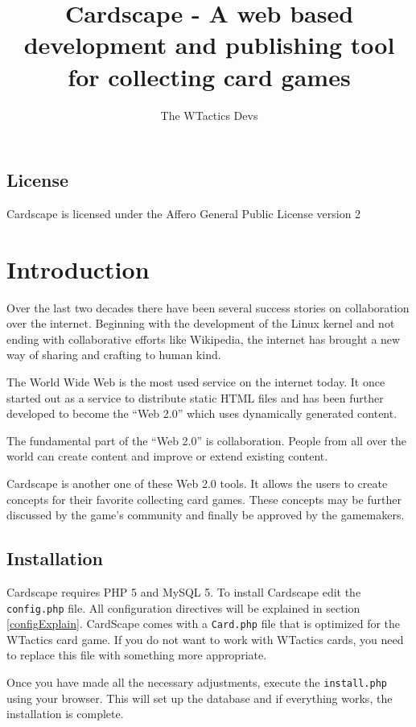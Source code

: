 \documentclass[a4paper, 11pt]{scrbook}
\title{Cardscape - A web based development and publishing tool for collecting card games}
\author{The WTactics Devs} %
\begin{document}
\maketitle
\tableofcontents

\section{License}
Cardscape is licensed under the Affero General Public License version 2%

\chapter{Introduction}
Over the last two decades there have been several success stories on collaboration over the internet. Beginning with the development of the Linux kernel and not ending with collaborative efforts like Wikipedia, the internet has brought a new way of sharing and crafting to human kind.

The World Wide Web is the most used service on the internet today. It once started out as a service to distribute static HTML files and has been further developed to become the ``Web 2.0'' which uses dynamically generated content.

The fundamental part of the ``Web 2.0'' is collaboration. People from all over the world can create content and improve or extend existing content.

Cardscape is another one of these Web 2.0 tools. It allows the users to create concepts for their favorite collecting card games. These concepts may be further discussed by the game's community and finally be approved by the gamemakers.

\section{Installation}
Cardscape requires PHP 5 and MySQL 5. To install Cardscape edit the \texttt{config.php} file. All configuration directives will be explained in section \ref{configExplain}. CardScape comes with a \texttt{Card.php} file that is optimized for the WTactics card game. If you do not want to work with WTactics cards, you need to replace this file with something more appropriate.

Once you have made all the necessary adjustments, execute the \texttt{install.php} using your browser. This will set up the database and if everything works, the installation is complete.
\end{document}
